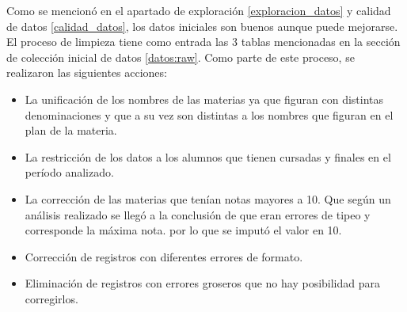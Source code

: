 
Como se mencionó en el apartado de exploración \ref{exploracion_datos} y calidad de datos \ref{calidad_datos}, los datos iniciales son buenos aunque puede mejorarse.\\
El proceso de limpieza tiene como entrada las 3 tablas mencionadas en la sección de colección inicial de datos \ref{datos:raw}. Como parte de este proceso, se realizaron las siguientes acciones:
\begin{itemize}
\item La unificación de los nombres de las materias ya que figuran con distintas denominaciones y que a su vez son distintas a los nombres que figuran en el plan de la materia.
\item La restricción de los datos a los alumnos que tienen cursadas y finales en el período analizado. 
\item La corrección de las materias que tenían notas mayores a 10. Que según un análisis realizado se llegó a la conclusión de que eran errores de tipeo y corresponde la máxima nota. por lo que se imputó el valor en 10. 
\item Corrección de registros con diferentes errores de formato.
\item Eliminación de registros con errores groseros que no hay posibilidad para corregirlos.
\end{itemize}



